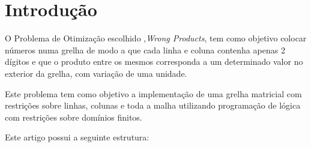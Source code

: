\documentclass[11pt]{article}
\begin{document}
\bigskip
\bigskip

\section{Introdução}

O Problema de Otimização escolhido ,\emph{Wrong Products}, tem como objetivo colocar números numa grelha de modo a que cada linha e coluna contenha apenas 2 dígitos e que o produto entre os mesmos corresponda a um determinado valor no exterior da grelha, com variação de uma unidade.

Este problema tem como objetivo a implementação de uma grelha matricial com restrições sobre linhas, colunas e toda a malha utilizando programação de lógica com restrições sobre domínios finitos.

\bigskip

Este artigo possui a seguinte estrutura:
\end{document}
